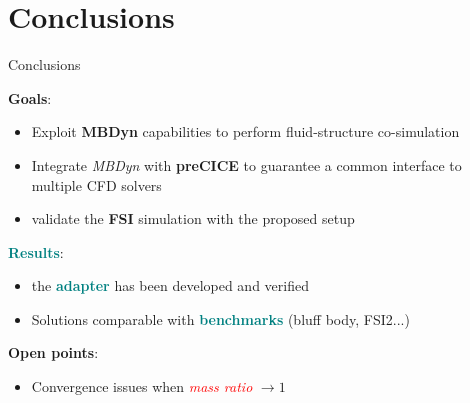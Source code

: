 \documentclass[10pt,t]{beamer}
\begin{document}
\section{Conclusions}

\begin{frame}{Conclusions}


\textcolor{pblue}{\textbf{Goals}}:

\begin{itemize}
    \item Exploit \textcolor{pblue}{\textbf{MBDyn}} capabilities to perform fluid-structure co-simulation
    \item Integrate \textit{MBDyn} with \textcolor{pblue}{\textbf{preCICE}} to guarantee a common interface to multiple CFD solvers
    \item validate the \textcolor{pblue}{\textbf{FSI}} simulation with the proposed setup
\end{itemize}

\pause

\vspace{0.5cm}

\textcolor{teal}{\textbf{Results}}:

\begin{itemize}
    \item the \textcolor{teal}{\textbf{adapter}} has been developed and verified
    \item Solutions comparable with \textcolor{teal}{\textbf{benchmarks}} (bluff body, FSI2...)
\end{itemize}

\pause

\vspace{0.5cm}

\textcolor{dorange}{\textbf{Open points}}:

\begin{itemize}
    \item Convergence issues when \textcolor{red}{\textit{mass ratio}} $\rightarrow 1$ 
\end{itemize}



\end{frame}
\end{document}
